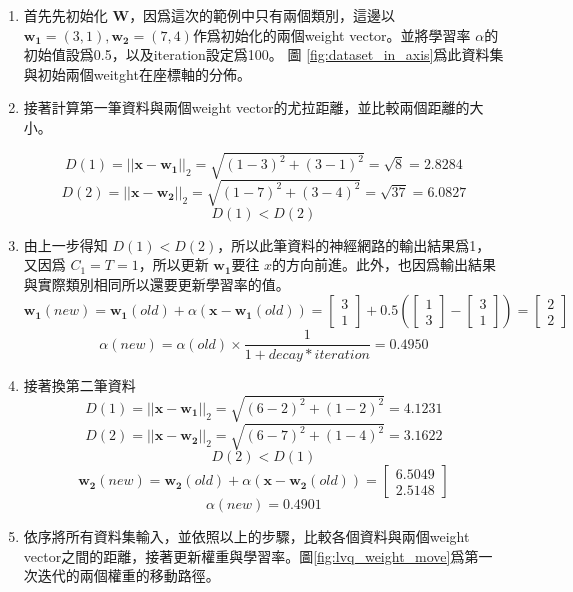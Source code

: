 \newpage
\begin{enumerate}
	\item
	      首先先初始化 \(\mathbf{W}\)，因爲這次的範例中只有兩個類別，這邊以 \(\mathbf{w_1}=(3,1),\mathbf{w_2}=(7,4)\)作爲初始化的兩個weight vector。並將學習率 \(\alpha\)的初始值設爲0.5，以及iteration設定爲100。
	      圖 \ref{fig:dataset_in_axis}爲此資料集與初始兩個weitght在座標軸的分佈。
	\item
	      接著計算第一筆資料與兩個weight vector的尤拉距離，並比較兩個距離的大小。

	      $$D(1)=||\mathbf{x}-\mathbf{w_1}||_2 = \sqrt{(1-3)^2+(3-1)^2}=\sqrt{8}=2.8284 $$
	      $$D(2)=||\mathbf{x}-\mathbf{w_2}||_2 = \sqrt{(1-7)^2+(3-4)^2}=\sqrt{37}=6.0827 $$
	      $$D(1)<D(2)$$

	\item
	      由上一步得知 \(D(1)<D(2)\)，所以此筆資料的神經網路的輸出結果爲1，又因爲 \(C_1 = T = 1\)，所以更新 \(\mathbf{w_1}\)要往 \(x\)的方向前進。此外，也因爲輸出結果與實際類別相同所以還要更新學習率的值。
	      $$\mathbf{w_1}(new) = \mathbf{w_1}(old) + \alpha(\mathbf{x-w_1}(old))= \begin{bmatrix}3\\ 1\end{bmatrix}+0.5(\begin{bmatrix}1\\ 3\end{bmatrix} - \begin{bmatrix}3\\ 1\end{bmatrix})= \begin{bmatrix}2\\ 2\end{bmatrix}  $$
	      $$\alpha(new) = \alpha(old)\times \frac{1}{1+decay*iteration} =0.4950$$

	\item
	      接著換第二筆資料
	      $$D(1)=||\mathbf{x}-\mathbf{w_1}||_2 = \sqrt{(6-2)^2+(1-2)^2}=4.1231 $$
	      $$D(2)=||\mathbf{x}-\mathbf{w_2}||_2 = \sqrt{(6-7)^2+(1-4)^2}=3.1622 $$
	      $$D(2)<D(1)$$
	      $$\mathbf{w_2}(new) = \mathbf{w_2}(old) + \alpha(\mathbf{x-w_2}(old))= \begin{bmatrix} 6.5049 \\ 2.5148 \end{bmatrix}  $$
	      $$\alpha(new) = 0.4901$$




	\item
		依序將所有資料集輸入，並依照以上的步驟，比較各個資料與兩個weight vector之間的距離，接著更新權重與學習率。圖\ref{fig:lvq_weight_move}爲第一次迭代的兩個權重的移動路徑。


\end{enumerate}
